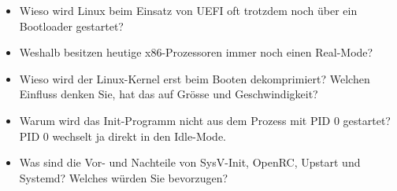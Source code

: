 \begin{itemize}
   \item Wieso wird Linux beim Einsatz von UEFI oft trotzdem noch über ein Bootloader gestartet?
   \item Weshalb besitzen heutige x86-Prozessoren immer noch einen Real-Mode?
   \item Wieso wird der Linux-Kernel erst beim Booten dekomprimiert? Welchen Einfluss denken Sie, hat das auf Grösse und Geschwindigkeit? 
   \item Warum wird das Init-Programm nicht aus dem Prozess mit PID 0 gestartet? PID 0 wechselt ja direkt in den Idle-Mode.
   \item Was sind die Vor- und Nachteile von SysV-Init, OpenRC, Upstart und Systemd? Welches würden Sie bevorzugen?
\end{itemize}

